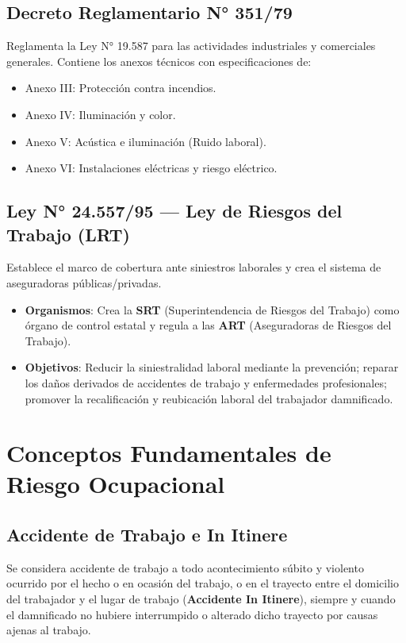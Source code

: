\documentclass[]{informeutn}
\begin{document}
\subsection{Decreto Reglamentario N° 351/79}
Reglamenta la Ley N° 19.587 para las actividades industriales y comerciales generales. Contiene los anexos técnicos con especificaciones de:
\begin{itemize}
    \item Anexo III: Protección contra incendios.
    \item Anexo IV: Iluminación y color.
    \item Anexo V: Acústica e iluminación (Ruido laboral).
    \item Anexo VI: Instalaciones eléctricas y riesgo eléctrico.
\end{itemize}

\subsection{Ley N° 24.557/95 — Ley de Riesgos del Trabajo (LRT)}
Establece el marco de cobertura ante siniestros laborales y crea el sistema de aseguradoras públicas/privadas.
\begin{itemize}
    \item \textbf{Organismos}: Crea la \textbf{SRT} (Superintendencia de Riesgos del Trabajo) como órgano de control estatal y regula a las \textbf{ART} (Aseguradoras de Riesgos del Trabajo).
    \item \textbf{Objetivos}: Reducir la siniestralidad laboral mediante la prevención; reparar los daños derivados de accidentes de trabajo y enfermedades profesionales; promover la recalificación y reubicación laboral del trabajador damnificado.
\end{itemize}

\section{Conceptos Fundamentales de Riesgo Ocupacional}

\subsection{Accidente de Trabajo e In Itinere}
\begin{tcolorbox}[title=Definición Legal de Accidente de Trabajo (Ley 24.557 - Art. 6)]
Se considera accidente de trabajo a todo acontecimiento súbito y violento ocurrido por el hecho o en ocasión del trabajo, o en el trayecto entre el domicilio del trabajador y el lugar de trabajo (\textbf{Accidente In Itinere}), siempre y cuando el damnificado no hubiere interrumpido o alterado dicho trayecto por causas ajenas al trabajo.
\end{tcolorbox}
\end{document}
